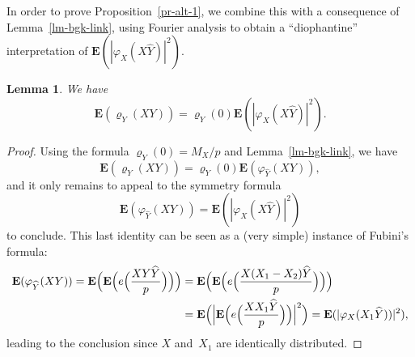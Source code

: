 \documentclass[12pt]{amsart}
\numberwithin{equation}{section}
\newcommand{\expect}{\mathbf{E}}
\renewcommand{\rho}{\varrho}
\theoremstyle{plain}
\newtheorem{lemma}[theorem]{Lemma}
\theoremstyle{remark}
\theoremstyle{definition}
\begin{document}
In order to prove Proposition~\ref{pr-alt-1}, we combine this with a
consequence of Lemma~\ref{lm-bgk-link}, using Fourier analysis to obtain
a ``diophantine'' interpretation of
$\expect(|\varphi_X(X\widehat{Y})|^2)$.

\begin{lemma}\label{lm-bgk-link2}
  We have
  $$ \expect(\rho_Y(XY))=\rho_Y(0) \expect(|\varphi_X(X\widehat{Y})|^2).
  $$
\end{lemma}

\begin{proof}
  Using the formula $\rho_Y(0)=M_X/p$ and Lemma~\ref{lm-bgk-link}, we
  have
  $$
  \expect(\rho_Y(XY))=\rho_Y(0)\expect(\varphi_{\widehat{Y}}(XY)),
  $$
  and it only remains to appeal to the symmetry formula
  $$
  \expect(\varphi_{\widehat{Y}}(XY))=
  \expect(|\varphi_X(X\widehat{Y})|^2)
  $$
  to conclude. This last identity can be seen as a (very simple)
  instance of Fubini's formula:
  \begin{align*}
    \expect(\varphi_{\widehat{Y}}(XY))=
    \expect\Bigl(\expect\Bigl(e\Bigl(\frac{XY\widehat{Y}}{p}\Bigr)
    \Bigr)\Bigr) &=\expect\Bigl(
    \expect\Bigl(e\Bigl(\frac{X(X_1-X_2)\widehat{Y}}{p}\Bigr)\Bigr)\Bigr)
    \\
    &=\expect\Bigl(\Bigl|\expect\Bigl(e\Bigl(\frac{XX_1\widehat{Y}}{p}
    \Bigr)\Bigr)\Bigr|^2\Bigr)=\expect(|\varphi_X(X_1\widehat{Y}))|^2),
  \end{align*}
  leading to the conclusion since $X$ and~$X_1$ are identically
  distributed.
\end{proof}
\end{document}
